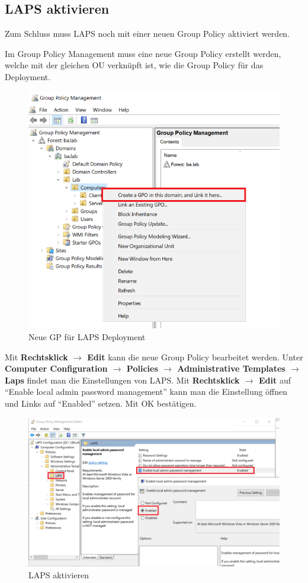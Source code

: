 \subsection{LAPS aktivieren}
Zum Schluss muss LAPS noch mit einer neuen Group Policy aktiviert werden.

Im Group Policy Management muss eine neue Group Policy erstellt werden, welche mit der gleichen OU verknüpft ist, wie die Group Policy für das Deployment.
\begin{figure}[H]
    \centering
    \includegraphics[width=0.7\linewidth]{../img/LAPS/GPO-Create-New.png}
    \caption{Neue GP für LAPS Deployment}
\end{figure}

Mit \textbf{Rechtsklick $\rightarrow$ Edit} kann die neue Group Policy bearbeitet werden.
Unter \textbf{Computer Configuration $\rightarrow$ Policies $\rightarrow$ Administrative Templates $\rightarrow$ Laps} findet man die Einstellungen von LAPS.
Mit \textbf{Rechtsklick $\rightarrow$ Edit} auf ``Enable local admin password management'' kann man die Einstellung öffnen und Links auf ``Enabled'' setzen.
Mit OK bestätigen.
\begin{figure}[H]
    \centering
    \includegraphics[width=0.7\linewidth]{../img/LAPS/enable-laps.png}
    \caption{LAPS aktivieren}
\end{figure}

